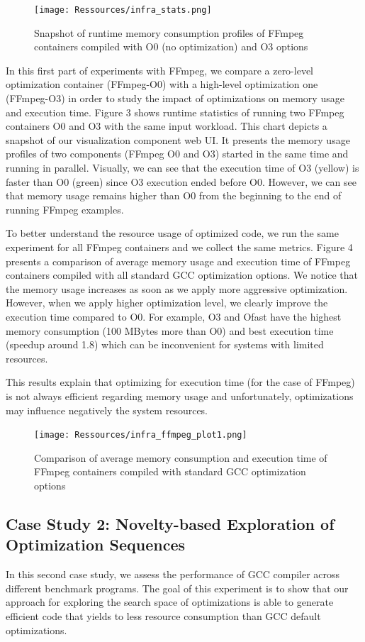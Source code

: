 \begin{figure}[tbh]
	\texttt{[image: Ressources/infra\_stats.png]}
	\caption{Snapshot of runtime memory consumption profiles of FFmpeg containers compiled with O0 (no optimization) and O3 options}
\end{figure}

In this first part of experiments with FFmpeg, we compare a zero-level optimization container (FFmpeg-O0) with a high-level optimization one (FFmpeg-O3) in order to study the impact of optimizations on memory usage and execution time. Figure 3 shows runtime statistics of running two FFmpeg containers O0 and O3 with the same input workload. This chart depicts a snapshot of our visualization component web UI. It presents the memory usage profiles of two components (FFmpeg O0 and O3) started in the same time and running in parallel. Visually, we can see that the execution time of O3 (yellow) is faster than O0 (green) since O3 execution ended before O0. However, we can see that memory usage remains higher than O0 from the beginning to the end of running FFmpeg examples. 

To better understand the resource usage of optimized code, we run the same experiment for all FFmpeg containers and we collect the same metrics. Figure 4 presents a comparison of average memory usage and execution time of FFmpeg containers compiled with all standard GCC optimization options. We notice that the memory usage increases as soon as we apply more aggressive optimization. However, when we apply higher optimization level, we clearly improve the execution time compared to O0. For example, O3 and Ofast have the highest memory consumption (100 MBytes more than O0) and best execution time (speedup around 1.8) which can be inconvenient for systems with limited resources.

This results explain that optimizing for execution time (for the case of FFmpeg) is not always efficient regarding memory usage and unfortunately, optimizations may influence negatively the system resources.
\begin{figure}[hbt]
	\centering
	\texttt{[image: Ressources/infra\_ffmpeg\_plot1.png]}
	\caption{Comparison of average memory consumption and execution time of FFmpeg containers compiled with standard GCC optimization options}
\end{figure}


\subsection{Case Study 2: Novelty-based Exploration of Optimization Sequences}
In this second case study, we assess the performance of GCC compiler across different benchmark programs. The goal of this experiment is to show that our approach for exploring the search space of optimizations is able to generate efficient code that yields to less resource consumption than GCC default optimizations.
